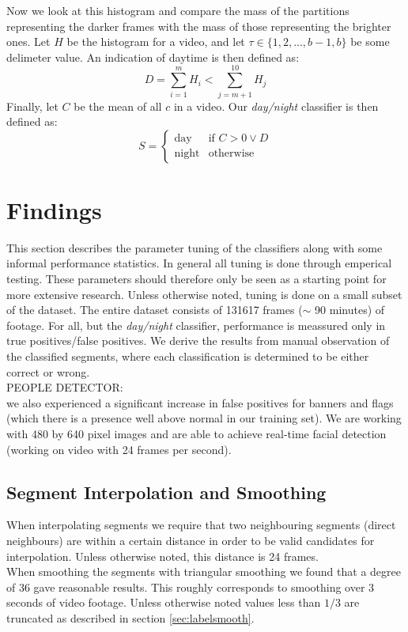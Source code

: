 %
Now we look at this histogram and compare the mass of the partitions representing the darker frames with the mass of those representing the brighter ones. Let $H$ be the histogram for a video, and let $\tau \in \{1,2,...,b-1,b\}$ be some delimeter value. An indication of daytime is then defined as:
%
\begin{equation}
D = \sum_{i=1}^{m}H_{i} < \sum_{j=m+1}^{10}H_{j}
\end{equation}
%
Finally, let $C$ be the mean of all $c$ in a video. Our \textit{day/night} classifier is then defined as:
\begin{equation}
S =
\begin{cases}
\text{day} & \text{if } C > 0 \vee D \\
\text{night} &  \text{otherwise}
\end{cases}
\end{equation}
%
%
\section{Findings}
%
This section describes the parameter tuning of the classifiers along with some informal performance statistics. In general all tuning is done through emperical testing. These parameters should therefore only be seen as a starting point for more extensive research. Unless otherwise noted, tuning is done on a small subset of the dataset. The entire dataset consists of 131617 frames ($\sim$ 90 minutes) of footage. For all, but the \textit{day/night} classifier, performance is meassured only in true positives/false positives. We derive the results from manual observation of the classified segments, where each classification is determined to be either correct or wrong.\\
%
PEOPLE DETECTOR:\\
we also experienced a significant increase in false positives for banners and flags (which there is a presence well above normal in our training set). We are working with 480 by 640 pixel images and are able to achieve real-time facial detection (working on video with 24 frames per second).\\
%
\subsection{Segment Interpolation and Smoothing}
%
When interpolating segments we require that two neighbouring segments (direct neighbours) are within a certain distance in order to be valid candidates for interpolation. Unless otherwise noted, this distance is 24 frames.\\
When smoothing the segments with triangular smoothing we found that a degree of 36 gave reasonable results. This roughly corresponds to smoothing over 3 seconds of video footage. Unless otherwise noted values less than $1/3$ are truncated as described in section \ref{sec:labelsmooth}.
%
